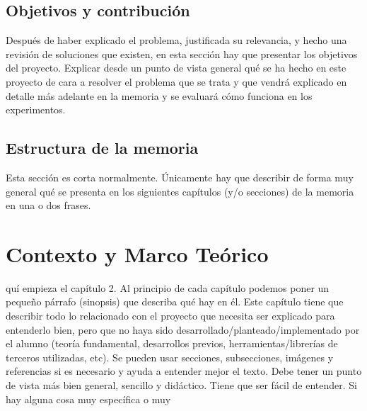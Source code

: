 \documentclass[a4paper,11pt,leqno, twoside]{memoir}
\begin{document}
\section{Objetivos y contribución}
\label{sec:objetivos_contribucion}

Después de haber explicado el problema, justificada su relevancia, y hecho una revisión de soluciones que existen, en esta sección hay que presentar los objetivos del proyecto. Explicar desde un punto de vista general qué se ha hecho en este proyecto de cara a resolver el problema que se trata y que vendrá explicado en detalle más adelante en la memoria y se evaluará cómo funciona en los experimentos.

\section{Estructura de la memoria}
\label{sec:estructura_memoria}

Esta sección es corta normalmente. Únicamente hay que describir de forma muy general qué se presenta en los siguientes capítulos (y/o secciones) de la memoria en una o dos frases.

\clearemptydoublepage
\chapter{Contexto y Marco Teórico}
\label{sec:contexto_marco_teorico}
\minitoc
\vspace{1cm}
quí empieza el capítulo 2. Al principio de cada capítulo podemos poner un pequeño párrafo (sinopsis) que describa qué hay en él. Este capítulo tiene que describir todo lo relacionado con el proyecto que necesita ser explicado para entenderlo bien, pero que no haya sido desarrollado/planteado/implementado por el alumno (teoría fundamental, desarrollos previos, herramientas/librerías de terceros utilizadas, etc). Se pueden usar secciones, subsecciones, imágenes y referencias si es necesario y ayuda a entender mejor el texto. Debe tener un punto de vista más bien general, sencillo y didáctico. Tiene que ser fácil de entender. Si hay alguna cosa muy específica o muy 
\newpage

\clearemptydoublepage
\end{document}
